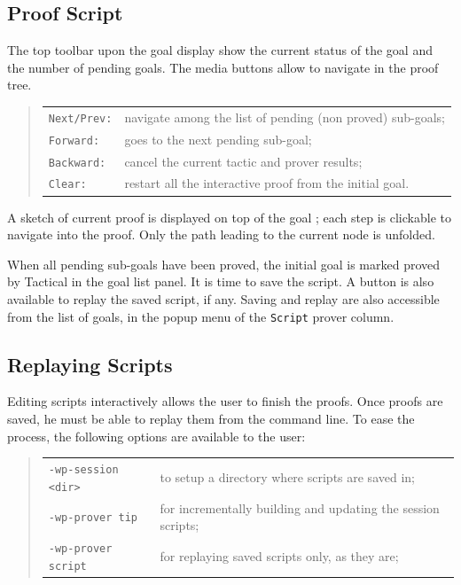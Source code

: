 \subsection{Proof Script}

The top toolbar upon the goal display show the current status of the goal and the number of pending goals. The media buttons allow to navigate in the proof tree.
\begin{quote}
\begin{tabular}{ll}
\verb+Next/Prev:+ & navigate among the list of pending (non proved) sub-goals; \\
\verb+Forward:+ & goes to the next pending sub-goal; \\
\verb+Backward:+ & cancel the current tactic and prover results; \\
\verb+Clear:+ & restart all the interactive proof from the initial goal.
\end{tabular}
\end{quote}

A sketch of current proof is displayed on top of the goal ; each step is clickable to navigate into the proof. Only the path leading to the current node is unfolded.

When all pending sub-goals have been proved, the initial goal is marked proved by \textsf{Tactical} in the goal list panel. It is time to save the script. A button is also available to replay the saved script, if any. Saving and replay are also accessible from the list of goals, in the popup menu of the \texttt{Script} prover column.

\subsection{Replaying Scripts}

Editing scripts interactively allows the user to finish the proofs. Once proofs are saved, he must be able to replay them from the command line. To ease the process, the following options are available to the user:
\begin{quote}
\begin{tabular}{ll}
\verb+-wp-session <dir>+ & to setup a directory where scripts are saved in; \\
\verb+-wp-prover tip+ & for incrementally building and updating the session scripts;\\
\verb+-wp-prover script+ & for replaying saved scripts only, as they are;\\
\end{tabular}
\end{quote}

